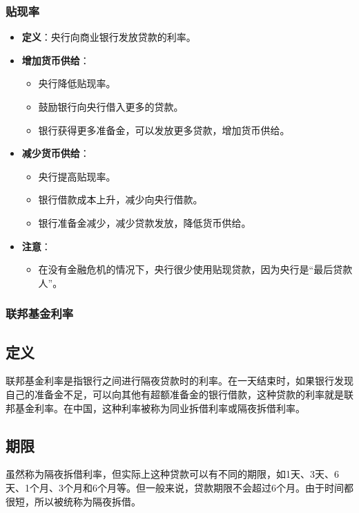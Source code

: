 \documentclass[12pt, a4paper]{article}
\begin{document}
\subsubsection{贴现率}
\begin{itemize}
    \item \textbf{定义}：央行向商业银行发放贷款的利率。
    \item \textbf{增加货币供给}：
    \begin{itemize}
        \item 央行降低贴现率。
        \item 鼓励银行向央行借入更多的贷款。
        \item 银行获得更多准备金，可以发放更多贷款，增加货币供给。
    \end{itemize}
    \item \textbf{减少货币供给}：
    \begin{itemize}
        \item 央行提高贴现率。
        \item 银行借款成本上升，减少向央行借款。
        \item 银行准备金减少，减少贷款发放，降低货币供给。
    \end{itemize}
    \item \textbf{注意}：
    \begin{itemize}
        \item 在没有金融危机的情况下，央行很少使用贴现贷款，因为央行是“最后贷款人”。
    \end{itemize}
\end{itemize}

\subsubsection{联邦基金利率}
\subsection*{定义}
联邦基金利率是指银行之间进行隔夜贷款时的利率。在一天结束时，如果银行发现自己的准备金不足，可以向其他有超额准备金的银行借款，这种贷款的利率就是联邦基金利率。在中国，这种利率被称为同业拆借利率或隔夜拆借利率。

\subsection*{期限}
虽然称为隔夜拆借利率，但实际上这种贷款可以有不同的期限，如1天、3天、6天、1个月、3个月和6个月等。但一般来说，贷款期限不会超过6个月。由于时间都很短，所以被统称为隔夜拆借。
\end{document}
